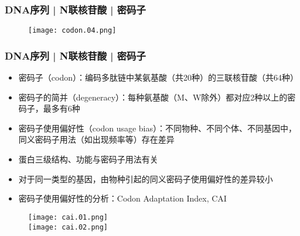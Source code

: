 \begin{frame}
  \frametitle{DNA序列 | N联核苷酸 | 密码子}
  \begin{figure}
    \centering
    \texttt{[image: codon.04.png]}
  \end{figure}
\end{frame}

\begin{frame}
  \frametitle{DNA序列 | N联核苷酸 | 密码子}
  \begin{itemize}
    \item 密码子（codon）：编码多肽链中某氨基酸（共20种）的三联核苷酸（共64种）
    \item 密码子的简并（degeneracy）：每种氨基酸（M、W除外）都对应2种以上的密码子，最多有6种
    \item 密码子使用偏好性（codon usage bias）：不同物种、不同个体、不同基因中，同义密码子用法（如出现频率等）存在差异
    \item 蛋白三级结构、功能与密码子用法有关
    \item 对于同一类型的基因，由物种引起的同义密码子使用偏好性的差异较小
    \item 密码子使用偏好性的分析：Codon Adaptation Index, CAI
  \end{itemize}
  \begin{figure}
    \centering
    \texttt{[image: cai.01.png]}
    \\
    \texttt{[image: cai.02.png]}
  \end{figure}
\end{frame}

